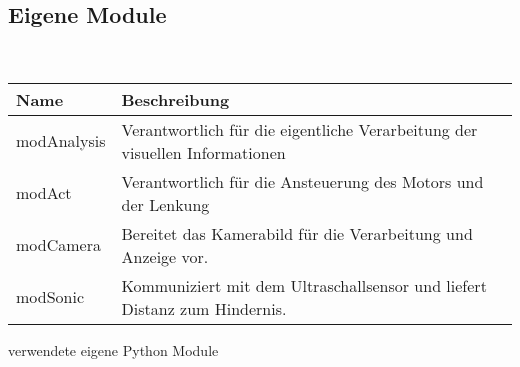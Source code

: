 \documentclass[a4paper,12pt]{article}
\begin{document}
    \subsection{Eigene Module}
    \ \\
    \begin{minipage}{\columnwidth}
      \makeatletter
      \def\@captype{table}
      \makeatother
      \centering
      \begin{tabular}{ l | l }
      Name & Beschreibung \\ \hline \hline
      modAnalysis & Verantwortlich für die eigentliche Verarbeitung der visuellen Informationen \\
      modAct & Verantwortlich für die Ansteuerung des Motors und der Lenkung \\
      modCamera & Bereitet das Kamerabild für die Verarbeitung und Anzeige vor. \\
      modSonic & Kommuniziert mit dem Ultraschallsensor und liefert Distanz zum Hindernis.\\
      \end{tabular}
      \caption{verwendete eigene Python Module}
      \label{tab:01}
    \end{minipage}


  \newpage  
  

  
  

    
  
   
  
  
  
  	
	
	
	
	
	
	
 
	
	


  \newpage
 
\end{document}
